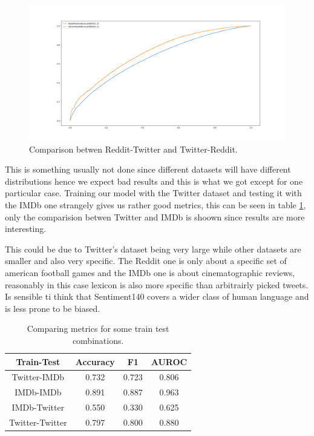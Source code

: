 \begin{figure}[h!t]
    \centering
    \includegraphics[scale=0.25]{../experiments/plots/RedditTwitter}
    \caption{Comparison betwen Reddit-Twitter and Twitter-Reddit.}
    \label{fig:TwitterReddit}
\end{figure}

This is something usually not done since different datasets will have different distributions hence we expect bad results and this is what we got except for one particular case.
Training our model with the Twitter dataset and testing it with the IMDb one strangely gives us rather good metrics, this can be seen in table \ref{tab:versus_metrics}, only the comparision betwen Twitter and IMDb is shoown since results are more interesting. 

This could be due to Twitter's dataset being very large while other datasets are smaller and also very specific.
The Reddit one is only about a specific set of american football games and the IMDb one is about cinematographic reviews, reasonably in this case lexicon is also more specific than arbitrairly picked tweets.
Is sensible ti think that Sentiment140 covers a wider class of human language and is less prone to be biased.

\begin{table}[h!t]
    \centering
    \caption{Comparing metrics for some train test combinations.}
    \label{tab:versus_metrics}
    \begin{tabular}{c|ccc}
        \hline
        Train-Test & Accuracy & F1 & AUROC \\
        \hline 
        Twitter-IMDb & 0.732 & 0.723 & 0.806 \\ 
        IMDb-IMDb & 0.891 & 0.887 & 0.963 \\ 
        IMDb-Twitter & 0.550 & 0.330 & 0.625 \\ 
        Twitter-Twitter & 0.797 & 0.800 & 0.880 \\ 
        \hline
    \end{tabular}
\end{table}
